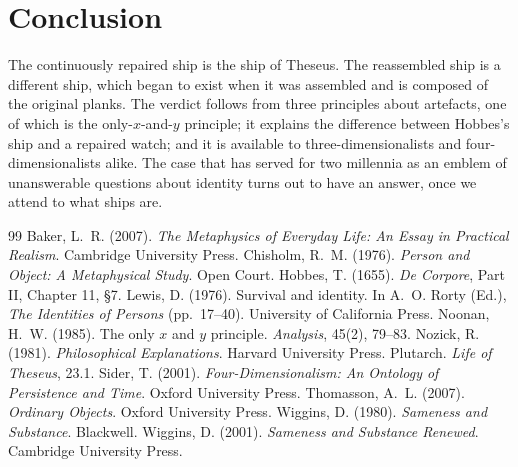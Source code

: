 \documentclass{situationist-preprint}
\begin{document}
\section{Conclusion}

The continuously repaired ship is the ship of Theseus. The reassembled ship is a different ship, which began to exist when it was assembled and is composed of the original planks. The verdict follows from three principles about artefacts, one of which is the only-$x$-and-$y$ principle; it explains the difference between Hobbes's ship and a repaired watch; and it is available to three-dimensionalists and four-dimensionalists alike. The case that has served for two millennia as an emblem of unanswerable questions about identity turns out to have an answer, once we attend to what ships are.

\begin{thebibliography}{99}\small
{} Baker, L.~R. (2007). \emph{The Metaphysics of Everyday Life: An Essay in Practical Realism}. Cambridge University Press.
 Chisholm, R.~M. (1976). \emph{Person and Object: A Metaphysical Study}. Open Court.
 Hobbes, T. (1655). \emph{De Corpore}, Part II, Chapter 11, §7.
 Lewis, D. (1976). Survival and identity. In A.~O. Rorty (Ed.), \emph{The Identities of Persons} (pp.~17--40). University of California Press.
 Noonan, H.~W. (1985). The only $x$ and $y$ principle. \emph{Analysis}, 45(2), 79--83.
 Nozick, R. (1981). \emph{Philosophical Explanations}. Harvard University Press.
 Plutarch. \emph{Life of Theseus}, 23.1.
 Sider, T. (2001). \emph{Four-Dimensionalism: An Ontology of Persistence and Time}. Oxford University Press.
 Thomasson, A.~L. (2007). \emph{Ordinary Objects}. Oxford University Press.
 Wiggins, D. (1980). \emph{Sameness and Substance}. Blackwell.
 Wiggins, D. (2001). \emph{Sameness and Substance Renewed}. Cambridge University Press.
\end{thebibliography}
\end{document}
